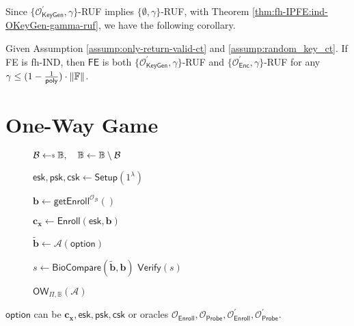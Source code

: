 Since $\{ \mathcal{O}^\prime_{\textsf{KeyGen}}, \gamma \}$-RUF implies $\{ \emptyset, \gamma \}$-RUF, with Theorem \ref{thm:fh-IPFE:ind-OKeyGen-gamma-ruf}, we have the following corollary.

\begin{corollary}
\label{cor:fh-IPFE:ind-OKeyGen-OEnc-ruf}
Given Assumption \ref{assump:only-return-valid-ct} and \ref{assump:random_key_ct}. If \textsf{FE} is fh-IND, then $\textsf{FE}$ is both $\{ \mathcal{O}^\prime_{\textsf{KeyGen}}, \gamma \}$-RUF and $\{ \mathcal{O}^\prime_{\textsf{Enc}}, \gamma \}$-RUF for any $\gamma \leq (1 - \frac{1}{\mathsf{poly}}) \cdot \|\mathbb{F}\|$.
\end{corollary}


\section{One-Way Game}

\begin{figure}[h]
\centering

	\begin{minipage}[t]{0.55\textwidth}
	\begin{algorithm}[H]
	\caption{$\textsf{OW}_{\Pi, \mathbb{B}}(\mathcal{A})$}
	\label{alg:ow_game}
	\begin{algorithmic}[1]

		\State $\mathcal{B} \getsdollar \mathbb{B}, \quad \mathbb{B} \gets \mathbb{B} \setminus \mathcal{B}$

		\State $\textsf{esk}, \textsf{psk}, \textsf{csk} \gets \textsf{Setup}(1^\lambda)$

		\State $\mathbf{b} \gets \textsf{getEnroll}^{\mathcal{O}_{\mathcal{B}}}()$

		\State $\mathbf{c_x} \gets \textsf{Enroll}(\textsf{esk}, \mathbf{b})$

		\State $\mathbf{\tilde{b}} \gets \mathcal{A}( \textsf{option} )$

		\State $s \gets \textsf{BioCompare}( \mathbf{\tilde{b}}, \mathbf{b})$
		\State \Return $ \textsf{Verify}(s) $
	\end{algorithmic}
	\end{algorithm}
	\end{minipage}

\label{fig:ow_game}
\end{figure}

\noindent $\textsf{option}$ can be $\mathbf{c_x}, \textsf{esk}, \textsf{psk}, \textsf{csk}$ or oracles $\mathcal{O}_{\textsf{Enroll}}, \mathcal{O}_{\textsf{Probe}}, \mathcal{O}^\prime_{\textsf{Enroll}}, \mathcal{O}^\prime_{\textsf{Probe}}$.

